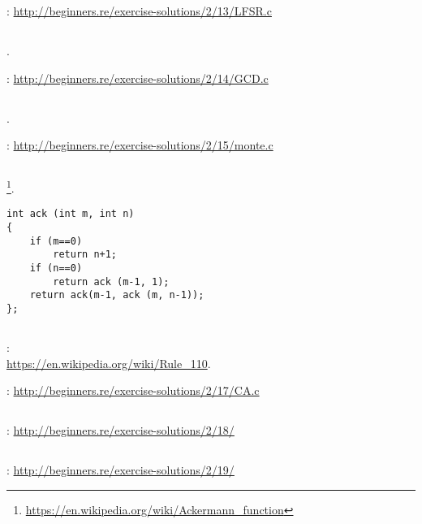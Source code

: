 \Sourcecode: \url{http://beginners.re/exercise-solutions/2/13/LFSR.c}

\subsection{}

.

\Sourcecode: \url{http://beginners.re/exercise-solutions/2/14/GCD.c}

\subsection{}

.

\Sourcecode: \url{http://beginners.re/exercise-solutions/2/15/monte.c}

\subsection{}

\footnote{\url{https://en.wikipedia.org/wiki/Ackermann_function}}.

\begin{lstlisting}
int ack (int m, int n)
{
	if (m==0)
		return n+1;
	if (n==0)
		return ack (m-1, 1);
	return ack(m-1, ack (m, n-1));
};
\end{lstlisting}

\subsection{}

:\\
\url{https://en.wikipedia.org/wiki/Rule_110}.

\Sourcecode: \url{http://beginners.re/exercise-solutions/2/17/CA.c}

\subsection{}

\Sourcecode: \url{http://beginners.re/exercise-solutions/2/18/}

\subsection{}

\Sourcecode: \url{http://beginners.re/exercise-solutions/2/19/}

